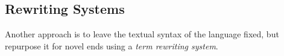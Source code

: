 {%


\subsection{Rewriting Systems}\label{sec:term-rewriting}
Another approach is to leave the textual syntax of the language fixed, but repurpose it for novel ends using a \emph{term rewriting system}.

}
